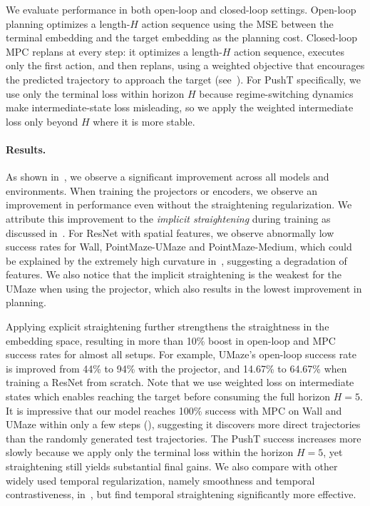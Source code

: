 We evaluate performance in both open-loop and closed-loop settings. Open-loop planning optimizes a length-$H$ action sequence using the MSE between the terminal embedding and the target embedding as the planning cost. Closed-loop MPC replans at every step: it optimizes a length-$H$ action sequence, executes only the first action, and then replans, using a weighted objective that encourages the predicted trajectory to approach the target (see~). For PushT specifically, we use only the terminal loss within horizon $H$ because regime-switching dynamics make intermediate-state loss misleading, so we apply the weighted intermediate loss only beyond $H$ where it is more stable.

\paragraph{Results.}  As shown in~,  we observe a significant improvement across all models and environments. When training the projectors or encoders, we observe an improvement in performance even without the straightening regularization. We attribute this improvement to the \emph{implicit straightening} during training as discussed in~. For ResNet with spatial features, we observe abnormally low success rates for Wall, PointMaze-UMaze and PointMaze-Medium, which could be explained by the extremely high curvature in~, suggesting a degradation of features. We also notice that the implicit straightening is the weakest for the UMaze when using the projector, which also results in the lowest improvement in planning. 

Applying explicit straightening further strengthens the straightness in the embedding space, resulting in more than 10\% boost in open-loop and MPC success rates for almost all setups. For example, UMaze's open-loop success rate is improved from 44\% to 94\% with the projector, and 14.67\% to 64.67\% when training a ResNet from scratch. Note that we use weighted loss on intermediate states which enables reaching the target before consuming the full horizon $H=5$. It is impressive that our model reaches 100\% success with MPC on Wall and UMaze within only a few steps (), suggesting it discovers more direct trajectories than the randomly generated test trajectories. The PushT success increases more slowly because we apply only the terminal loss within the horizon $H=5$, yet straightening still yields substantial final gains. We also compare with other widely used temporal regularization, namely smoothness and temporal contrastiveness, in~, but find temporal straightening significantly more effective. 

